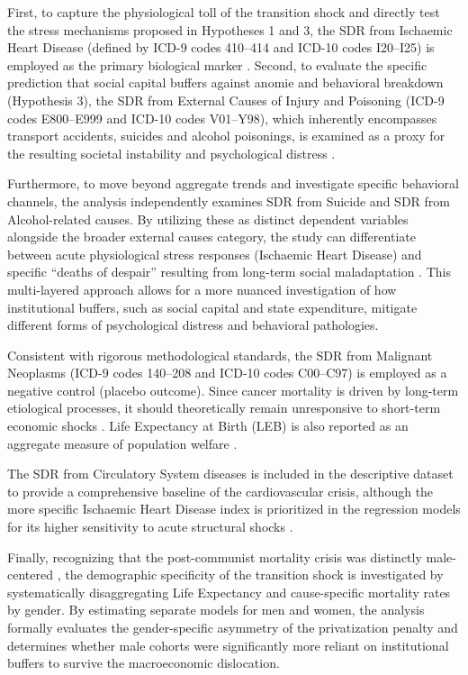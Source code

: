 \documentclass[en,magisterska]{pracamgr}
\begin{document}
First, to capture the physiological toll of the transition shock and directly test the stress mechanisms proposed in Hypotheses 1 and 3, the SDR from 
Ischaemic Heart Disease (defined by ICD-9 codes 410--414 and ICD-10 codes I20--I25) is employed as the primary biological marker \citep{Cornia2016, Leon1998}. 
Second, to evaluate the specific prediction that social capital buffers against anomie and behavioral breakdown (Hypothesis 3), the SDR from External Causes 
of Injury and Poisoning (ICD-9 codes E800--E999 and ICD-10 codes V01--Y98), which inherently encompasses transport accidents, suicides and alcohol poisonings, is 
examined as a proxy for the resulting societal instability and psychological distress \citep{Stuckler2009, Brainerd2001}.

Furthermore, to move beyond aggregate trends and investigate specific behavioral channels, the analysis independently examines SDR from 
Suicide and SDR from Alcohol-related causes. By utilizing these as distinct dependent variables alongside the broader external causes category, 
the study can differentiate between acute physiological stress responses (Ischaemic Heart Disease) and specific ``deaths of despair'' resulting from 
long-term social maladaptation \citep{Zaridze2009, King2009, Brainerd2001}. This multi-layered approach allows for a more nuanced investigation of how 
institutional buffers, such as social capital and state expenditure, mitigate different forms of psychological distress and behavioral pathologies.

Consistent with rigorous methodological standards, the SDR from Malignant Neoplasms (ICD-9 codes 140--208 and ICD-10 codes 
C00--C97) is employed as a negative control (placebo outcome). Since cancer mortality is driven by long-term etiological processes, 
it should theoretically remain unresponsive to short-term economic shocks \citep{Leon1997, Brainerd2005}. Life Expectancy at Birth (LEB) is also 
reported as an aggregate measure of population welfare \citep{Cornia2016, B_Brainerd1998}.

The SDR from Circulatory System diseases is included in the descriptive dataset to provide a comprehensive baseline of the 
cardiovascular crisis, although the more specific Ischaemic Heart Disease index is prioritized in the regression models for its higher 
sensitivity to acute structural shocks \citep{Cornia2016, Zaridze2009}.

Finally, recognizing that the post-communist mortality crisis was distinctly male-centered \citep{B_Brainerd1998, Leon1998}, the demographic 
specificity of the transition shock is investigated by systematically disaggregating Life Expectancy and cause-specific mortality rates by gender. 
By estimating separate models for men and women, the analysis formally evaluates the gender-specific asymmetry of the privatization penalty and 
determines whether male cohorts were significantly more reliant on institutional buffers to survive the macroeconomic dislocation.
\end{document}
